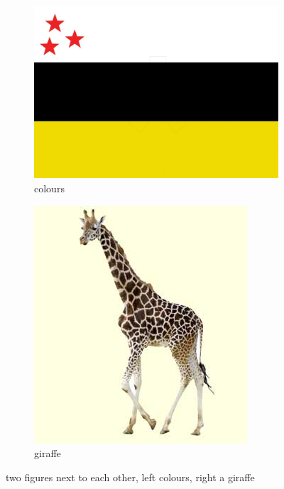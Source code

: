 \documentclass[thesis]{subfiles}
\begin{document}
\begin{figure}
	\begin{subfigure}[b]
		{0.45\textwidth}
		\centering
		\includegraphics[width=\linewidth]{ibavlag.jpg}
		\caption{colours}
		\label{fig:coulors}
	\end{subfigure}
	\begin{subfigure}[b]
		{0.45\textwidth}
		\centering
		\includegraphics[width=\linewidth]{Giraffe_klein.jpg}
		\caption{giraffe}
		\label{fig:littleanimal}
	\end{subfigure}	
	\caption{two figures next to each other, left colours, right a giraffe}
	\label{fig:subfigures}
\end{figure}
		
\end{document}
